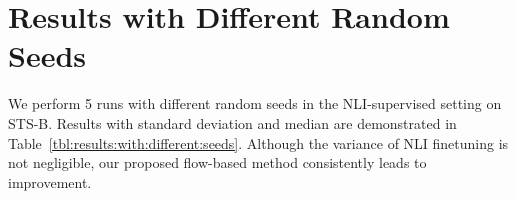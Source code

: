 \documentclass[11pt,a4paper]{article}
\begin{document}
\newpage
\section{Results with Different Random Seeds}
\label{sec:appendix:results:with:different:seeds}
We perform 5 runs with different random seeds in the NLI-supervised setting on STS-B. Results with standard deviation and median are demonstrated in Table~\ref{tbl:results:with:different:seeds}. Although the variance of NLI finetuning is not negligible, our proposed flow-based method consistently leads to improvement.

\begin{table}[!h]
\centering
{}
\caption{Results with different random seeds.}
\label{tbl:results:with:different:seeds}
\end{table}

 
\end{document}
